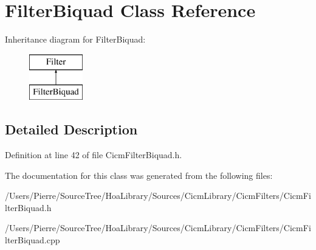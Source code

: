 \hypertarget{class_filter_biquad}{\section{Filter\-Biquad Class Reference}
\label{class_filter_biquad}
}
Inheritance diagram for Filter\-Biquad\-:\begin{figure}[H]
\begin{center}
\leavevmode
\includegraphics[height=2.000000cm]{class_filter_biquad}
\end{center}
\end{figure}


\subsection{Detailed Description}


Definition at line 42 of file Cicm\-Filter\-Biquad.\-h.



The documentation for this class was generated from the following files\-:\begin{DoxyCompactItemize}
\item 
/\-Users/\-Pierre/\-Source\-Tree/\-Hoa\-Library/\-Sources/\-Cicm\-Library/\-Cicm\-Filters/Cicm\-Filter\-Biquad.\-h\item 
/\-Users/\-Pierre/\-Source\-Tree/\-Hoa\-Library/\-Sources/\-Cicm\-Library/\-Cicm\-Filters/Cicm\-Filter\-Biquad.\-cpp\end{DoxyCompactItemize}

